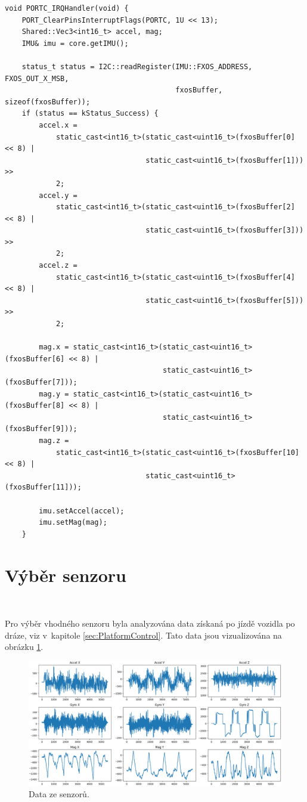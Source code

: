\begin{lstlisting}[caption = Funkce obsluhy přerušení na portu C, label = lst:interruptC]
void PORTC_IRQHandler(void) {
    PORT_ClearPinsInterruptFlags(PORTC, 1U << 13);
    Shared::Vec3<int16_t> accel, mag;
    IMU& imu = core.getIMU();

    status_t status = I2C::readRegister(IMU::FXOS_ADDRESS, FXOS_OUT_X_MSB,
                                        fxosBuffer, sizeof(fxosBuffer));
    if (status == kStatus_Success) {
        accel.x =
            static_cast<int16_t>(static_cast<uint16_t>(fxosBuffer[0] << 8) |
                                 static_cast<uint16_t>(fxosBuffer[1])) >>
            2;
        accel.y =
            static_cast<int16_t>(static_cast<uint16_t>(fxosBuffer[2] << 8) |
                                 static_cast<uint16_t>(fxosBuffer[3])) >>
            2;
        accel.z =
            static_cast<int16_t>(static_cast<uint16_t>(fxosBuffer[4] << 8) |
                                 static_cast<uint16_t>(fxosBuffer[5])) >>
            2;

        mag.x = static_cast<int16_t>(static_cast<uint16_t>(fxosBuffer[6] << 8) |
                                     static_cast<uint16_t>(fxosBuffer[7]));
        mag.y = static_cast<int16_t>(static_cast<uint16_t>(fxosBuffer[8] << 8) |
                                     static_cast<uint16_t>(fxosBuffer[9]));
        mag.z =
            static_cast<int16_t>(static_cast<uint16_t>(fxosBuffer[10] << 8) |
                                 static_cast<uint16_t>(fxosBuffer[11]));

        imu.setAccel(accel);
        imu.setMag(mag);
    }
\end{lstlisting}

\section{Výběr senzoru}\

Pro výběr vhodného senzoru byla analyzována data získaná po jízdě vozidla po dráze,
viz v~kapitole \ref{sec:PlatformControl}. Tato data jsou vizualizována na obrázku
\ref{fig:Sensors}.
\begin{figure}[!h]
    \centering
    \includegraphics[width = 1\linewidth]{Figures/Sensors.png}
    \caption{Data ze senzorů.}
    \label{fig:Sensors}
\end{figure}

